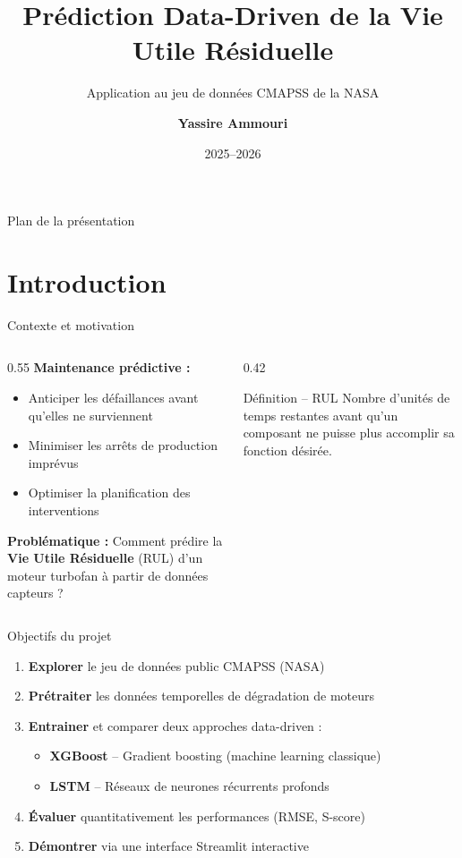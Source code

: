 \documentclass[aspectratio=169,11pt]{beamer}
\title[Prédiction RUL CMAPSS]{\textbf{Prédiction Data-Driven de la Vie Utile Résiduelle}}
\subtitle{Application au jeu de données CMAPSS de la NASA}
\author[Yassire Ammouri]{\textbf{Yassire Ammouri}}
\institute[École d'Ingénieurs]{SUPMTI Rabat -- Projet de Fin de Module}
\date{2025--2026}
\begin{document}
\begin{frame}[plain]
\titlepage
\end{frame}

\begin{frame}{Plan de la présentation}
\tableofcontents
\end{frame}

\section{Introduction}

\begin{frame}{Contexte et motivation}
\begin{columns}[T]
\begin{column}{0.55\textwidth}
\textbf{Maintenance prédictive :}
\begin{itemize}
    \item Anticiper les défaillances avant qu'elles ne surviennent
    \item Minimiser les arrêts de production imprévus
    \item Optimiser la planification des interventions
\end{itemize}
\vspace{0.3cm}
\textbf{Problématique :} Comment prédire la \textcolor{accentorange}{\textbf{Vie Utile Résiduelle}} (RUL) d'un moteur turbofan à partir de données capteurs ?
\end{column}
\begin{column}{0.42\textwidth}
\begin{block}{Définition -- RUL}
Nombre d'unités de temps restantes avant qu'un composant ne puisse plus accomplir sa fonction désirée.
\end{block}
\end{column}
\end{columns}
\end{frame}

\begin{frame}{Objectifs du projet}
\begin{enumerate}
    \item \textbf{Explorer} le jeu de données public CMAPSS (NASA)
    \item \textbf{Prétraiter} les données temporelles de dégradation de moteurs
    \item \textbf{Entrainer} et comparer deux approches data-driven :
    \begin{itemize}
        \item \textbf{XGBoost} -- Gradient boosting (machine learning classique)
        \item \textbf{LSTM} -- Réseaux de neurones récurrents profonds
    \end{itemize}
    \item \textbf{Évaluer} quantitativement les performances (RMSE, S-score)
    \item \textbf{Démontrer} via une interface Streamlit interactive
\end{enumerate}
\end{frame}
\end{document}

